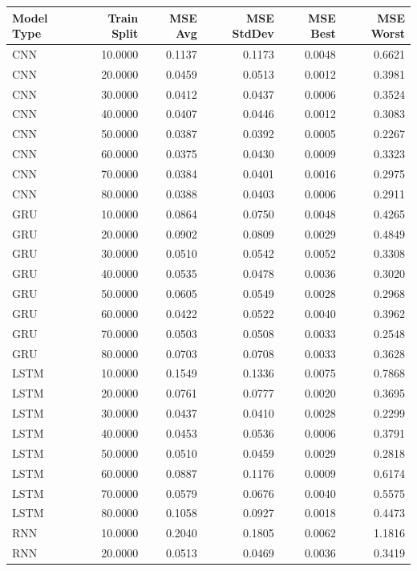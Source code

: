 \begin{tabular}{lrrrrr}
\toprule
Model Type & Train Split & MSE Avg & MSE StdDev & MSE Best & MSE Worst \\
\midrule
CNN & 10.0000 & 0.1137 & 0.1173 & 0.0048 & 0.6621 \\
CNN & 20.0000 & 0.0459 & 0.0513 & 0.0012 & 0.3981 \\
CNN & 30.0000 & 0.0412 & 0.0437 & 0.0006 & 0.3524 \\
CNN & 40.0000 & 0.0407 & 0.0446 & 0.0012 & 0.3083 \\
CNN & 50.0000 & 0.0387 & 0.0392 & 0.0005 & 0.2267 \\
CNN & 60.0000 & 0.0375 & 0.0430 & 0.0009 & 0.3323 \\
CNN & 70.0000 & 0.0384 & 0.0401 & 0.0016 & 0.2975 \\
CNN & 80.0000 & 0.0388 & 0.0403 & 0.0006 & 0.2911 \\
GRU & 10.0000 & 0.0864 & 0.0750 & 0.0048 & 0.4265 \\
GRU & 20.0000 & 0.0902 & 0.0809 & 0.0029 & 0.4849 \\
GRU & 30.0000 & 0.0510 & 0.0542 & 0.0052 & 0.3308 \\
GRU & 40.0000 & 0.0535 & 0.0478 & 0.0036 & 0.3020 \\
GRU & 50.0000 & 0.0605 & 0.0549 & 0.0028 & 0.2968 \\
GRU & 60.0000 & 0.0422 & 0.0522 & 0.0040 & 0.3962 \\
GRU & 70.0000 & 0.0503 & 0.0508 & 0.0033 & 0.2548 \\
GRU & 80.0000 & 0.0703 & 0.0708 & 0.0033 & 0.3628 \\
LSTM & 10.0000 & 0.1549 & 0.1336 & 0.0075 & 0.7868 \\
LSTM & 20.0000 & 0.0761 & 0.0777 & 0.0020 & 0.3695 \\
LSTM & 30.0000 & 0.0437 & 0.0410 & 0.0028 & 0.2299 \\
LSTM & 40.0000 & 0.0453 & 0.0536 & 0.0006 & 0.3791 \\
LSTM & 50.0000 & 0.0510 & 0.0459 & 0.0029 & 0.2818 \\
LSTM & 60.0000 & 0.0887 & 0.1176 & 0.0009 & 0.6174 \\
LSTM & 70.0000 & 0.0579 & 0.0676 & 0.0040 & 0.5575 \\
LSTM & 80.0000 & 0.1058 & 0.0927 & 0.0018 & 0.4473 \\
RNN & 10.0000 & 0.2040 & 0.1805 & 0.0062 & 1.1816 \\
RNN & 20.0000 & 0.0513 & 0.0469 & 0.0036 & 0.3419 \\

\end{tabular}

